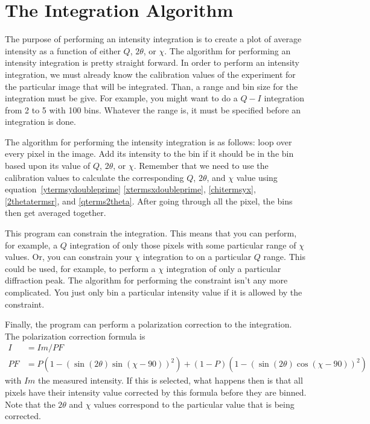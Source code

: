 \section{The Integration Algorithm}

The purpose of performing an intensity integration is 
to create a plot of average intensity as a function
of either $Q$, $2\theta$, or $\chi$. The algorithm
for performing an intensity integration is pretty
straight forward. In order to perform an intensity
integration, we must already know the calibration values
of the experiment for the particular image that will
be integrated. Than, a range and bin size for the
integration must be give. For example, you might
want to do a $Q-I$ integration from 2 to 5 with
100 bins. Whatever the range is, it 
must be specified before an integration is done.

The algorithm for performing the intensity integration
is as follows: loop over every pixel in the image. 
Add its intensity to the bin if it should be
in the bin based upon its value of $Q$, $2\theta$, or 
$\chi$. Remember that we need to use the calibration
values to calculate the corresponding $Q$, $2\theta$, and 
$\chi$ value using equation~\ref{ytermsydoubleprime}
\ref{xtermsxdoubleprime}, \ref{chitermsyx}, 
\ref{2thetatermsr}, and \ref{qterms2theta}.
After going through all the pixel, the bins then get averaged 
together. 

This program can constrain the integration. 
This means that you can perform, for example,
a $Q$ integration of only those pixels with some
particular range of $\chi$ values. Or, you can
constrain your $\chi$ integration to on a particular
$Q$ range. This could be used, for example, to
perform a $\chi$ integration of only a particular
diffraction peak. The algorithm for performing
the constraint isn't any more complicated. You just
only bin a particular intensity value if it is
allowed by the constraint.

Finally, the program can perform a polarization 
correction to the integration. The polarization 
correction formula is
\begin{align}
    I&=Im/PF \\ 
    PF&=P(1 - (\sin(2\theta)\sin(\chi-90))^2) + 
    (1 - P)(1 - (\sin(2\theta)\cos(\chi-90))^2)
\end{align}
with $Im$ the measured intensity. If this
is selected, what happens
then is that all pixels have their intensity
value corrected by this formula before they
are binned. Note that the $2\theta$ and $\chi$
values correspond to the particular value
that is being corrected.

